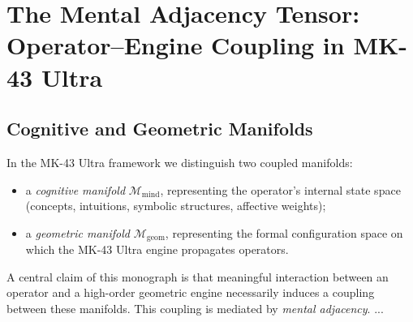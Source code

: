 
\chapter{The Mental Adjacency Tensor: Operator--Engine Coupling in MK-43 Ultra}

\section{Cognitive and Geometric Manifolds}

In the MK-43 Ultra framework we distinguish two coupled manifolds:
\begin{itemize}
  \item a \emph{cognitive manifold} $\mathcal{M}_{\mathrm{mind}}$, representing the operator's internal state space (concepts, intuitions, symbolic structures, affective weights);
  \item a \emph{geometric manifold} $\mathcal{M}_{\mathrm{geom}}$, representing the formal configuration space on which the MK-43 Ultra engine propagates operators.
\end{itemize}
A central claim of this monograph is that meaningful interaction between an operator and a high-order geometric engine necessarily induces a coupling between these manifolds. This coupling is mediated by \emph{mental adjacency}.
...
